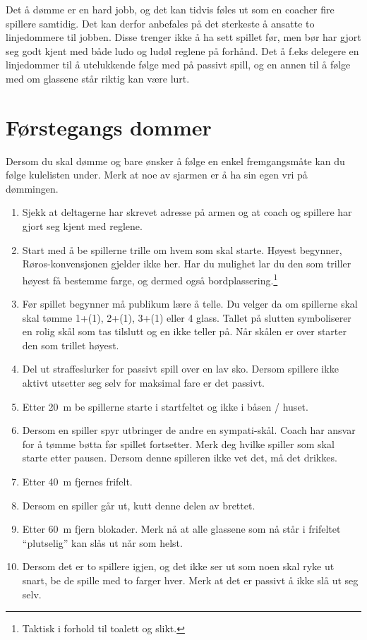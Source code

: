 \documentclass[10pt,a4paper,norsk,openany]{book}
\begin{document}
Det å dømme er en hard jobb, og det kan tidvis føles ut som en coacher fire
spillere samtidig. Det kan derfor anbefales på det sterkeste å ansatte to
linjedommere til jobben. Disse trenger ikke å ha sett spillet før, men bør har
gjort seg godt kjent med både ludo og ludøl reglene på forhånd. Det å f.eks
delegere en linjedommer til å utelukkende følge med på passivt spill, og en
annen til å følge med om glassene står riktig kan være lurt. 

\section{Førstegangs dommer} \label{sec:forstegangs-dommer} Dersom du skal
dømme og bare ønsker å følge en enkel fremgangsmåte kan du følge kulelisten
under. Merk at noe av sjarmen er å ha sin egen vri på dømmingen.
%
\begin{enumerate}
    \item Sjekk at deltagerne har skrevet adresse på armen og at coach og
    spillere har gjort seg kjent med reglene.
    
    \item Start med å be spillerne trille om hvem som skal starte. Høyest
    begynner, Røros-konvensjonen gjelder ikke her. Har du mulighet lar du den
    som triller høyest få bestemme farge, og dermed også
    bordplassering.\footnote{Taktisk i forhold til toalett og slikt.}
    
  \item Før spillet begynner må publikum lære å telle. Du velger da om
    spillerne skal skal tømme 1+(1), 2+(1), 3+(1) eller 4 glass. Tallet på
    slutten symboliserer en rolig skål som tas tilslutt og en ikke teller på.
    Når skålen er over starter den som trillet høyest.
    
  \item Del ut straffeslurker for passivt spill over en lav sko. Dersom spillere
    ikke aktivt utsetter seg selv for maksimal fare er det passivt.
    
  \item Etter \SI{20}{\m} be spillerne starte i startfeltet og ikke i båsen /
    huset.
    
  \item Dersom en spiller spyr utbringer de andre en sympati-skål. Coach har
    ansvar for å tømme bøtta før spillet fortsetter. Merk deg hvilke spiller som
    skal starte etter pausen. Dersom denne spilleren ikke vet det, må det
    drikkes.
    
  \item Etter \SI{40}{m} fjernes frifelt.
    
  \item Dersom en spiller går ut, kutt denne delen av brettet.
    
  \item Etter \SI{60}{m} fjern blokader. Merk nå at alle glassene som nå står i
    frifeltet ``plutselig'' kan slås ut når som helst.
    
  \item Dersom det er to spillere igjen, og det ikke ser ut som noen skal ryke
    ut snart, be de spille med to farger hver. Merk at det er passivt å ikke slå
    ut seg selv. 
\end{enumerate}
\end{document}
